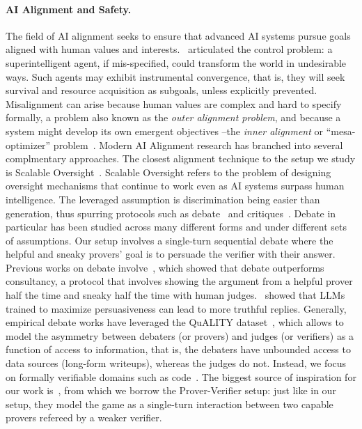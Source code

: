 \paragraph{AI Alignment and Safety.} The field of AI alignment seeks to ensure that advanced AI systems pursue goals aligned with human values and interests.~\citet{bostrom2014superintelligence} articulated the control problem: a superintelligent agent, if mis-specified, could transform the world in undesirable ways. Such agents may exhibit instrumental convergence, that is, they will seek survival and resource acquisition as subgoals, unless explicitly prevented. Misalignment can arise because human values are complex and hard to specify formally, a problem also known as the \emph{outer alignment problem}, and because a system might develop its own emergent objectives --the \emph{inner alignment} or ``mesa-optimizer'' problem~\citep{hubinger2019risks}. Modern AI Alignment research has branched into several complmentary approaches. The closest alignment technique to the setup we study is Scalable Oversight~\citep{bowman2022measuring}. Scalable Oversight refers to the problem of designing oversight mechanisms that continue to work even as AI systems surpass human intelligence. The leveraged assumption is discrimination being easier than generation, thus spurring protocols such as debate~\citep{irving2018ai} and critiques~\citep{saunders2022self, mcaleese2024llm}. Debate in particular has been studied across many different forms and under different sets of assumptions. Our setup involves a single-turn sequential debate where the helpful and sneaky provers' goal is to persuade the verifier with their answer. Previous works on debate involve~\citet{michael2023debate}, which showed that debate outperforms consultancy, a protocol that involves showing the argument from a helpful prover half the time and sneaky half the time with human judges.~\citet{khan2024debating} showed that LLMs trained to maximize persuasiveness can lead to more truthful replies. Generally, empirical debate works have leveraged the QuALITY dataset~\citep{pang-etal-2022-quality}, which allows to model the asymmetry between debaters (or provers) and judges (or verifiers) as a function of access to information, that is, the debaters have unbounded access to data sources (long-form writeups), whereas the judges do not. Instead, we focus on formally verifiable domains such as code~\citep{hendrycks2021measuring}. The biggest source of inspiration for our work is~\citet{kirchner2024prover}, from which we borrow the Prover-Verifier setup: just like in our setup, they model the game as a single-turn interaction between two capable provers refereed by a weaker verifier.

